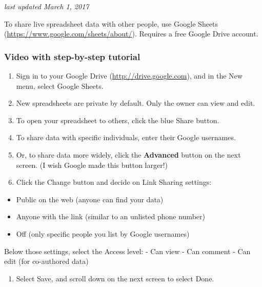 \documentclass[
  english,
]{book}
\providecommand{\tightlist}{%
  \setlength{\itemsep}{0pt}\setlength{\parskip}{0pt}}
\begin{document}
\emph{last updated March 1, 2017}

To share live spreadsheet data with other people, use Google Sheets (\url{https://www.google.com/sheets/about/}). Requires a free Google
Drive account.

\hypertarget{video-with-step-by-step-tutorial}{%
\subsubsection*{Video with step-by-step tutorial}\label{video-with-step-by-step-tutorial}}

\begin{enumerate}
\def\labelenumi{\arabic{enumi})}
\item
  Sign in to your Google Drive (\url{http://drive.google.com}), and in the New menu, select Google Sheets.
\item
  New spreadsheets are private by default. Only the owner can view and edit.
\item
  To open your spreadsheet to others, click the blue Share button.
\item
  To share data with specific individuals, enter their Google usernames.
\item
  Or, to share data more widely, click the \textbf{Advanced} button on the next screen. (I wish Google made this button larger!)
\item
  Click the Change button and decide on Link Sharing settings:
\end{enumerate}

\begin{itemize}
\tightlist
\item
  Public on the web (anyone can find your data)
\item
  Anyone with the link (similar to an unlisted phone number)
\item
  Off (only specific people you list by Google usernames)
\end{itemize}

Below those settings, select the Access level:
- Can view
- Can comment
- Can edit (for co-authored data)

\begin{enumerate}
\def\labelenumi{\arabic{enumi})}
\setcounter{enumi}{6}
\tightlist
\item
  Select Save, and scroll down on the next screen to select Done.
\end{enumerate}
\end{document}
